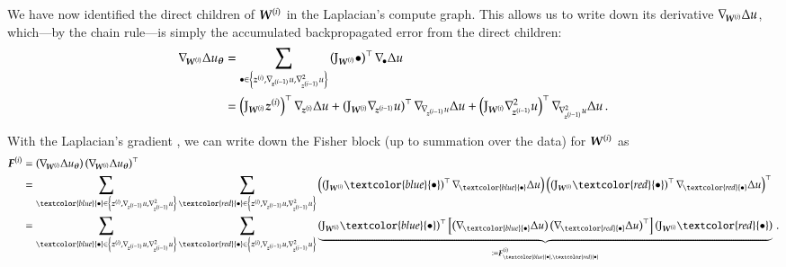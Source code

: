 We have now identified the direct children of ${\boldsymbol{W}}^{(i)}$ in the Laplacian's compute graph.
This allows us to write down its derivative $\nabla_{\!{{\boldsymbol{W}}^{(i)}}} \Delta u$, which---by the chain rule---is simply the accumulated backpropagated error from the direct children:
\begin{align}\label{eq:laplacian-gradient}
  \begin{split}
    \grad{\mW^{(i)}} \Delta u_{\vtheta}
    &=
      \sum_{\bullet \in \left\{ \vz^{(i)}, \grad{\vz^{(i-1)}}u, \gradsquared{\vz^{(i-1)}}u \right\}}
      \left(
      \jac_{\mW^{(i)}}\bullet
      \right)^{\top}
      \grad{\bullet}\Delta u
    \\
    &=
      \left(
      \jac_{\mW^{(i)}}\vz^{(i)}
      \right)^{\top}
      \grad{\vz^{(i)}}\Delta u
      +
      \left(
      \jac_{\mW^{(i)}}\grad{\vz^{(i-1)}}u
      \right)^{\top}
      \grad{\grad{\vz^{(i-1)}}u}\Delta u
      +
      \left(
      \jac_{\mW^{(i)}}\gradsquared{\vz^{(i-1)}}u
      \right)^{\top}
      \grad{\gradsquared{\vz^{(i-1)}}u}\Delta u\,.
  \end{split}
\end{align}

With the Laplacian's gradient , we can write down the Fisher block (up to summation over the data) for ${\boldsymbol{W}}^{(i)}$ as
\begin{align}\label{eq:fisher}
  \begin{split}
    \mF^{(i)}
    &=
      \left(
      \grad{\mW^{(i)}} \Delta u_{\vtheta}
      \right)
      \left(
      \grad{\mW^{(i)}} \Delta u_{\vtheta}
      \right)^{\top}
    \\
    &=
      \sum_{\textcolor{blue}{\bullet} \in \left\{ \vz^{(i)}, \grad{\vz^{(i-1)}}u, \gradsquared{\vz^{(i-1)}}u \right\}}
      \sum_{\textcolor{red}{\bullet} \in \left\{ \vz^{(i)}, \grad{\vz^{(i-1)}}u, \gradsquared{\vz^{(i-1)}}u \right\}}
      \left(
      \left(
      \jac_{\mW^{(i)}}\textcolor{blue}{\bullet}
      \right)^{\top}
      \grad{\textcolor{blue}{\bullet}}\Delta u
      \right)
      \left(
      \left(
      \jac_{\mW^{(i)}}\textcolor{red}{\bullet}
      \right)^{\top}
      \grad{\textcolor{red}{\bullet}}\Delta u
      \right)^{\top}
    \\
    &=
      \sum_{\textcolor{blue}{\bullet} \in \left\{ \vz^{(i)}, \grad{\vz^{(i-1)}}u, \gradsquared{\vz^{(i-1)}}u \right\}}
      \sum_{\textcolor{red}{\bullet} \in \left\{ \vz^{(i)}, \grad{\vz^{(i-1)}}u, \gradsquared{\vz^{(i-1)}}u \right\}}
      \underbrace{
      \left(
      \jac_{\mW^{(i)}}\textcolor{blue}{\bullet}
      \right)^{\top}
      \left[
      \left(
      \grad{\textcolor{blue}{\bullet}}\Delta u
      \right)
      \left(
      \grad{\textcolor{red}{\bullet}}\Delta u
      \right)^{\top}
      \right]
      \left(
      \jac_{\mW^{(i)}}\textcolor{red}{\bullet}
      \right)}_{
      \coloneqq \mF^{(i)}_{\textcolor{blue}{\bullet}, \textcolor{red}{\bullet}}
      }\,.
  \end{split}
\end{align}

